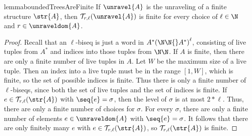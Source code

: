 \ifmainpart
\begin{restatable}{lemma}{boundedTreesAreFinite}\label{lem:bounded-trees-are-finite}
  If $\unravel{A}$ is the unraveling of a finite structure $\str{A}$, then $\mathcal{T}_{r,\ell}(\unravel{A})$ is finite for every choice of $\ell \in \N$ and $r \in \unraveldom{A}$.
\end{restatable}
\fi
\ifmainpart
\begin{proof}
Recall that an $\ell$-biseq is just a word in $A^*{(\N\N{}A^{*})}^{\ell}$, consisting of live tuples from $A^{*}$ and indices into those tuples from $\N\N$.
If $A$ is finite, then there are only a finite number of live tuples in $A$.
Let $W$ be the maximum size of a live tuple.
Then an index into a live tuple must be in the range $[1,W]$, which is finite, so the set of possible indices is finite.
Thus there is only a finite number of $\ell$-biseqs, since both the set of live tuples and the set of indices is finite.
If $e \in \mathcal{T}_{r,\ell}(\str{A})$ with $\seq{e} = \sigma$, then the level of $\sigma$ is at most $2 * \ell$.
Thus, there are only a finite number of choices for $\sigma$.
For every $\sigma$, there are only a finite number of elements $e \in \unraveldom{A}$ with $\seq{e} = \sigma$.
It follows that there are only finitely many $e$ with $e \in \mathcal{T}_{r,\ell}(\str{A})$, so $\mathcal{T}_{r,\ell}(\str{A})$ is finite.
\end{proof}
\fi
